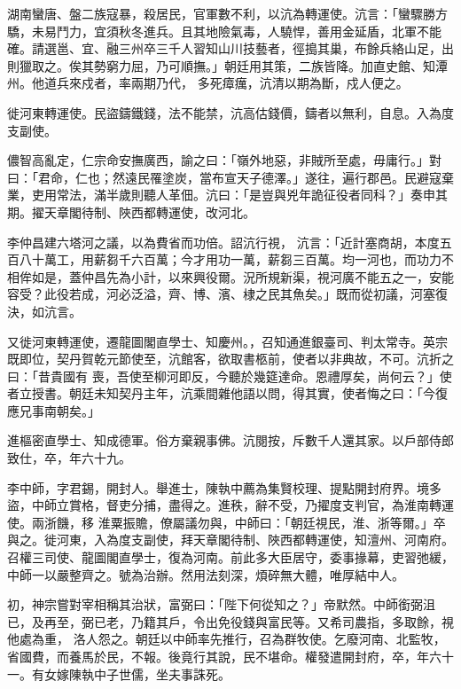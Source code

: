 \begin{pinyinscope}
 湖南蠻唐、盤二族寇暴，殺居民，官軍數不利，以沆為轉運使。沆言：「蠻驟勝方驕，未易鬥力，宜須秋冬進兵。且其地險氣毒，人驍悍，善用金延盾，北軍不能確。請選邕、宜、融三州卒三千人習知山川技藝者，徑搗其巢，布餘兵絡山足，出則獵取之。俟其勢窮力屈，乃可順撫。」朝廷用其策，二族皆降。加直史館、知潭州。他道兵來戍者，率兩期乃代，
 多死瘴癘，沆清以期為斷，戍人便之。



 徙河東轉運使。民盜鑄鐵錢，法不能禁，沆高估錢價，鑄者以無利，自息。入為度支副使。



 儂智高亂定，仁宗命安撫廣西，諭之曰：「嶺外地惡，非賊所至處，毋庸行。」對曰：「君命，仁也；然遠民罹塗炭，當布宣天子德澤。」遂往，遍行郡邑。民避寇棄業，吏用常法，滿半歲則聽人革佃。沆曰：「是豈與兇年詭征役者同科？」奏申其期。擢天章閣待制、陜西都轉運使，改河北。



 李仲昌建六塔河之議，以為費省而功倍。詔沆行視，
 沆言：「近計塞商胡，本度五百八十萬工，用薪芻千六百萬；今才用功一萬，薪芻三百萬。均一河也，而功力不相侔如是，蓋仲昌先為小計，以來興役爾。況所規新渠，視河廣不能五之一，安能容受？此役若成，河必泛溢，齊、博、濱、棣之民其魚矣。」既而從初議，河塞復決，如沆言。



 又徙河東轉運使，遷龍圖閣直學士、知慶州。，召知通進銀臺司、判太常寺。英宗既即位，契丹賀乾元節使至，沆館客，欲取書柩前，使者以非典故，不可。沆折之曰：「昔貴國有
 喪，吾使至柳河即反，今聽於幾筵達命。恩禮厚矣，尚何云？」使者立授書。朝廷未知契丹主年，沆乘間雜他語以問，得其實，使者悔之曰：「今復應兄事南朝矣。」



 進樞密直學士、知成德軍。俗方棄親事佛。沆閱按，斥數千人還其家。以戶部侍郎致仕，卒，年六十九。



 李中師，字君錫，開封人。舉進士，陳執中薦為集賢校理、提點開封府界。境多盜，中師立賞格，督吏分捕，盡得之。進秩，辭不受，乃擢度支判官，為淮南轉運使。兩浙饑，移
 淮粟振贍，僚屬議勿與，中師曰：「朝廷視民，淮、浙等爾。」卒與之。徙河東，入為度支副使，拜天章閣待制、陜西都轉運使，知澶州、河南府。召權三司使、龍圖閣直學士，復為河南。前此多大臣居守，委事掾幕，吏習弛緩，中師一以嚴整齊之。號為治辦。然用法刻深，煩碎無大體，唯厚結中人。



 初，神宗嘗對宰相稱其治狀，富弼曰：「陛下何從知之？」帝默然。中師銜弼沮已，及再至，弼已老，乃籍其戶，令出免役錢與富民等。又希司農指，多取餘，視他處為重，
 洛人怨之。朝廷以中師率先推行，召為群牧使。乞廢河南、北監牧，省國費，而養馬於民，不報。後竟行其說，民不堪命。權發遣開封府，卒，年六十一。有女嫁陳執中子世儒，坐夫事誅死。




\end{pinyinscope}
